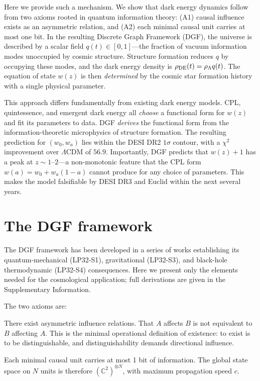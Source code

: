 \documentclass[12pt,a4paper]{article}
\begin{document}
Here we provide such a mechanism. We show that dark energy dynamics follow from two axioms rooted in quantum information theory: (A1) causal influence exists as an asymmetric relation, and (A2) each minimal causal unit carries at most one bit. In the resulting Discrete Graph Framework (DGF), the universe is described by a scalar field $q(t)\in[0,1]$---the fraction of vacuum information modes unoccupied by cosmic structure. Structure formation reduces $q$ by occupying these modes, and the dark energy density is $\rho_{\rm DE}(t)=\rho_\Lambda q(t)$. The equation of state $w(z)$ is then {\it determined} by the cosmic star formation history with a single physical parameter.

This approach differs fundamentally from existing dark energy models. CPL, quintessence, and emergent dark energy all {\it choose} a functional form for $w(z)$ and fit its parameters to data. DGF {\it derives} the functional form from the information-theoretic microphysics of structure formation. The resulting prediction for $(w_0,w_a)$ lies within the DESI DR2 $1\sigma$ contour, with a $\chi^2$ improvement over $\Lambda$CDM of $56.9$. Importantly, DGF predicts that $w(z)+1$ has a peak at $z\sim1$--$2$---a non-monotonic feature that the CPL form $w(a)=w_0+w_a(1-a)$ cannot produce for any choice of parameters. This makes the model falsifiable by DESI DR3 and Euclid within the next several years.

\section*{The DGF framework}

The DGF framework has been developed in a series of works establishing its quantum-mechanical (LP32-S1), gravitational (LP32-S3), and black-hole thermodynamic (LP32-S4) consequences. Here we present only the elements needed for the cosmological application; full derivations are given in the Supplementary Information.

The two axioms are:

\vspace{4pt}
 There exist asymmetric influence relations. That $A$ affects $B$ is not equivalent to $B$ affecting $A$. This is the minimal operational definition of existence: to exist is to be distinguishable, and distinguishability demands directional influence.

 Each minimal causal unit carries at most 1 bit of information. The global state space on $N$ units is therefore $(\mathbb{C}^2)^{\otimes N}$, with maximum propagation speed $c$.
\end{document}
